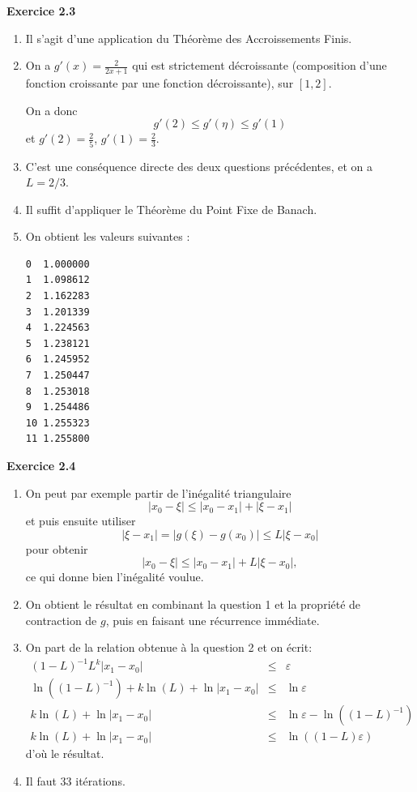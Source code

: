 \documentclass{article}
\begin{document}
{\bf Exercice 2.3}

\begin{enumerate}
    \item Il s'agit d'une application du Théorème des Accroissements Finis.
    
    \item On a $g'(x) = \frac{2}{2x+1}$ qui est strictement décroissante (composition d'une fonction croissante par une fonction décroissante), sur $[1,2]$.
    
    On a donc $$ g'(2) \leq g'(\eta) \leq g'(1) $$
    et $g'(2) = \frac{2}{5}$, $g'(1) = \frac{2}{3}$.
    
    \item C'est une conséquence directe des deux questions précédentes, et on a $L = 2/3$.
    
    \item Il suffit d'appliquer le Théorème du Point Fixe de Banach.
    
     \item On obtient les valeurs suivantes :

\begin{verbatim}
0  1.000000
1  1.098612
2  1.162283
3  1.201339
4  1.224563
5  1.238121
6  1.245952
7  1.250447
8  1.253018
9  1.254486
10 1.255323
11 1.255800
\end{verbatim}
    
\end{enumerate}

{\bf Exercice 2.4}

\begin{enumerate}
    \item On peut par exemple partir de l'inégalité triangulaire 
    \[
    | x_0 - \xi | \leq | x_0 - x_1 | + | \xi - x_1 |
    \]
    et puis ensuite utiliser
    \[
    | \xi - x_1 | = | g(\xi) - g(x_0) | \leq L 
    | \xi - x_0 |
    \]
    pour obtenir
    \[
    | x_0 - \xi | \leq | x_0 - x_1 | +
    L | \xi - x_0 |,
    \]
    ce qui donne bien l'inégalité voulue.
    \item On obtient le résultat en combinant la question 1 et la propriété de contraction de $g$, puis en faisant une récurrence immédiate.
    
    \item On part de la relation obtenue à la question 2 et on écrit:
    \begin{eqnarray*}
    (1-L)^{-1} L^k |x_1 - x_0| & \leq & \varepsilon\\
    \ln((1-L)^{-1} ) + k \ln(L) + \ln |x_1 - x_0| & \leq & \ln \varepsilon \\
    k \ln(L) + \ln |x_1 - x_0| & \leq & \ln \varepsilon - \ln((1-L)^{-1} ) \\
    k \ln(L) + \ln |x_1 - x_0| & \leq & \ln ((1-L)\varepsilon)
    \end{eqnarray*}
    d'où le résultat.
    
    \item Il faut 33 itérations.
    
\end{enumerate}
\end{document}

